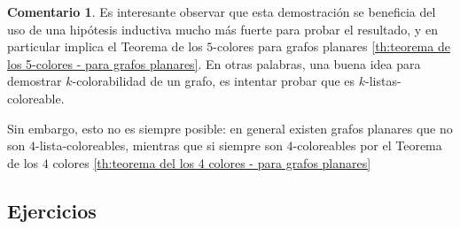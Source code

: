 \documentclass[12pt]{report}
\theoremstyle{plain}
\theoremstyle{definition}
\newtheorem{remark}[theorem]{Comentario}
\begin{document}
\begin{remark}
Es interesante observar que esta demostración se beneficia del uso de una hipótesis inductiva mucho más fuerte para probar el resultado, y en particular implica el Teorema de los $5$-colores para grafos planares \ref{th:teorema de los 5-colores - para grafos planares}. En otras palabras, una buena idea para demostrar $k$-colorabilidad de un grafo, es intentar probar que es $k$-listas-coloreable.

Sin embargo, esto no es siempre posible: en general existen grafos planares que no son $4$-lista-coloreables, mientras que si siempre son $4$-coloreables por el Teorema de los $4$ colores \ref{th:teorema del los 4 colores - para grafos planares}

\end{remark}











\subsection{Ejercicios}
\end{document}
